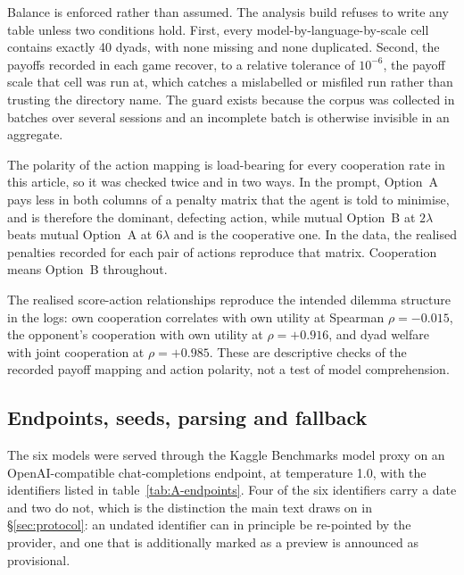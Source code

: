 \documentclass[openacc]{rsproca_new}
\newcommand{\lam}{\lambda}
\begin{document}
Balance is enforced rather than assumed. The analysis build refuses to write
any table unless two conditions hold. First, every model-by-language-by-scale
cell contains exactly 40 dyads, with none missing and none duplicated. Second,
the payoffs recorded in each game recover, to a relative tolerance of $10^{-6}$,
the payoff scale that cell was run at, which catches a mislabelled or
misfiled run rather than trusting the directory name. The guard exists because
the corpus was collected in batches over several sessions and an incomplete
batch is otherwise invisible in an aggregate.

The polarity of the action mapping is load-bearing for every cooperation rate
in this article, so it was checked twice and in two ways. In the prompt,
Option~A pays less in both columns of a penalty matrix that the agent is told
to minimise, and is therefore the dominant, defecting action, while mutual
Option~B at $2\lam$ beats mutual Option~A at $6\lam$ and is the cooperative
one. In the data, the realised penalties recorded for each pair of actions
reproduce that matrix. Cooperation means Option~B throughout.

The realised score-action relationships reproduce the intended dilemma
structure in the logs: own cooperation correlates with own utility at Spearman
$\rho = -0.015$, the opponent's cooperation with own utility at $\rho = +0.916$,
and dyad welfare with joint cooperation at $\rho = +0.985$. These are
descriptive checks of the recorded payoff mapping and action polarity, not a
test of model comprehension.

\subsection{Endpoints, seeds, parsing and fallback}\label{appendix:endpoints}

The six models were served through the Kaggle Benchmarks model proxy on an
OpenAI-compatible chat-completions endpoint, at temperature 1.0, with the
identifiers listed in table~\ref{tab:A-endpoints}. Four of the six identifiers
carry a date and two do not, which is the distinction the main text draws on in
\S\ref{sec:protocol}: an undated identifier can in principle be re-pointed by
the provider, and one that is additionally marked as a preview is announced as
provisional.
\end{document}
